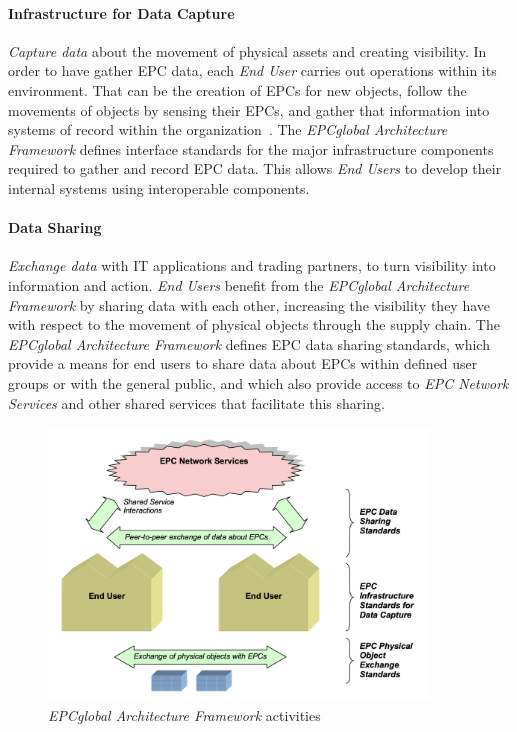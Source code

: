 \paragraph{Infrastructure for Data Capture} 

\emph{Capture data} about the movement of physical assets and creating visibility.
In order to have gather \gls{EPC} data, each \emph{End User} carries out operations within its environment. That can be the creation of \gls{EPC}s for new objects, follow the movements of objects by sensing their \gls{EPC}s, and gather that information into systems of record within the organization~\cite{Architecture6framework20140414Pdf}. The \emph{EPCglobal Architecture Framework} defines interface standards for the major infrastructure components required to gather and record \gls{EPC} data. This allows \emph{End Users} to develop their internal systems using interoperable components.

\paragraph{Data Sharing} 

\emph{Exchange data} with \gls{IT} applications and trading partners, to turn visibility into information and action.
\emph{End Users} benefit from the \emph{EPCglobal Architecture Framework} by sharing data with each other, increasing the visibility they have with respect to the movement of physical objects through the \gls{supply chain}. 
The \emph{EPCglobal Architecture Framework} defines \gls{EPC} data sharing standards, which provide a means for end users to share data about \gls{EPC}s within defined user groups or with the general public, and which also provide access to \emph{EPC Network Services} and other shared services that facilitate this sharing. 

\begin{figure}[!ht]
    \centering
    \includegraphics[width=0.9\textwidth]{./assets/02-state-of-the-art/architecture-framework-activities.png}
    \caption{\emph{EPCglobal Architecture Framework} activities~\cite{Architecture6framework20140414Pdf}} 
    \label{fig:02:architecture-activities}
\end{figure}

